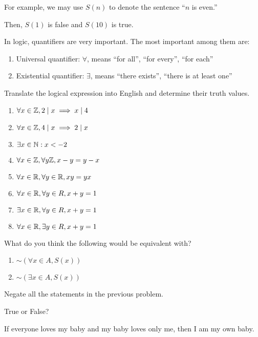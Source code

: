 \documentclass[12pt]{amsart}
\begin{document}
For example, we may use $S(n)$ to denote the sentence ``$n$ is even.''

Then, $S(1)$ is false and $S(10)$ is true.

\begin{definition}
	In logic, quantifiers are very important. The most important among them are:
	\begin{enumerate}
		\item Universal quantifier: $\forall$, means ``for all'', ``for every'', ``for each''
		\item Existential quantifier: $\exists$, means ``there exists'', ``there is at least one''
	\end{enumerate}
\end{definition}


\begin{problem}
Translate the logical expression into English and determine their truth values.

\begin{enumerate}
	\item $\forall x \in \mathbb{Z}, 2 \mid  x \implies x \mid 4$
	      \vspace{3cm}
	\item $\forall x\in \mathbb{Z}, 4 \mid x \implies 2 \mid x$
	      \vspace{3cm}
	\item $\exists x \in \mathbb{N}: x< -2$
	      \vspace{3cm}
	\item $\forall x \in \mathbb{Z}, \forall y \mathbb{Z}, x-y = y -x $
	      \vspace{3cm}
	\item $\forall x \in \mathbb{R}, \forall y \in \mathbb{R}, xy = yx$
	      \vspace{3cm}
	\item $\forall x\in \mathbb{R}, \forall y \in R, x + y = 1$
	      \vspace{3cm}
	\item $\exists x\in \mathbb{R}, \forall y \in R, x + y = 1$
	      \vspace{3cm}
	\item $\forall x\in \mathbb{R}, \exists y \in R, x + y = 1$
	      \vspace{3cm}
\end{enumerate}
\end{problem}

\begin{definition}
	What do you think the following would be equivalent with?
	\begin{enumerate}
		\item $\sim \left( \forall x \in A, S(x)  \right)$
		      \vspace{3cm}
		\item $\sim \left( \exists x \in A, S(x)  \right)$
		      \vspace{3cm}
	\end{enumerate}
\end{definition}
\newpage

\begin{problem}
Negate all the statements in the previous problem.
\end{problem}

\newpage

\begin{problem}
True or False?

If everyone loves my baby and my baby loves only me, then I am my own baby.
\end{problem}
\end{document}
